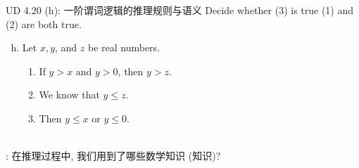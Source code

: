 \begin{frame}{}
  \begin{exampleblock}{UD 4.20 (h): 一阶谓词逻辑的推理规则与语义}
    Decide whether (3) is true  (1) and (2) are both true.

    \begin{enumerate}[(a)]
      \setcounter{enumi}{7}
      \item Let $x,y$, and $z$ be real numbers.
	\begin{enumerate}[(1)]
	  \item If $y > x$ and $y > 0$, then $y > z$.
	  \item We know that $y \le z$.
	  \item Then $y \le x$ or $y \le 0$.
	\end{enumerate}
    \end{enumerate}
  \end{exampleblock}

  \pause
  \vspace{0.30cm}
  \begin{center}
    {} \\[15pt] \pause
    {: 在推理过程中, 我们用到了哪些数学知识 (知识)?}
  \end{center}
\end{frame}
